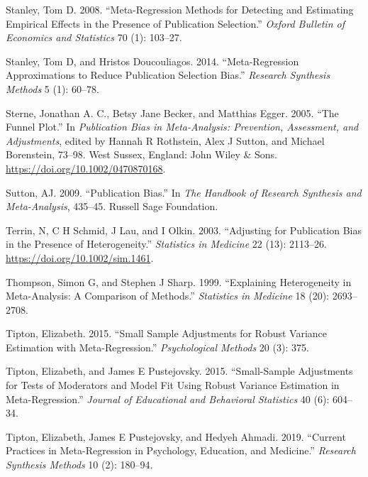 \documentclass[
]{article}
\newlength{\cslhangindent}
\newenvironment{CSLReferences}[2] %
 {\begin{list}{}{%
  \setlength{\itemindent}{0pt}
  \setlength{\leftmargin}{0pt}
  \setlength{\parsep}{0pt}
  \ifodd #1
   \setlength{\leftmargin}{\cslhangindent}
   \setlength{\itemindent}{-1\cslhangindent}
  \fi
  \setlength{\itemsep}{#2\baselineskip}}}
 {\end{list}}
\begin{document}
\begin{CSLReferences}{1}{0}
Stanley, Tom D. 2008. {``Meta-Regression Methods for Detecting and
Estimating Empirical Effects in the Presence of Publication
Selection.''} \emph{Oxford Bulletin of Economics and Statistics} 70 (1):
103--27.

Stanley, Tom D, and Hristos Doucouliagos. 2014. {``Meta-Regression
Approximations to Reduce Publication Selection Bias.''} \emph{Research
Synthesis Methods} 5 (1): 60--78.

Sterne, Jonathan A. C., Betsy Jane Becker, and Matthias Egger. 2005.
{``The Funnel Plot.''} In \emph{Publication {Bias} in {Meta-Analysis}:
{Prevention}, {Assessment}, and {Adjustments}}, edited by Hannah R
Rothstein, Alex J Sutton, and Michael Borenstein, 73--98. {West Sussex,
England}: {John Wiley \& Sons}.
\url{https://doi.org/10.1002/0470870168}.

Sutton, AJ. 2009. {``Publication Bias.''} In \emph{The Handbook of
Research Synthesis and Meta-Analysis}, 435--45. Russell Sage Foundation.

Terrin, N, C H Schmid, J Lau, and I Olkin. 2003. {``Adjusting for
Publication Bias in the Presence of Heterogeneity.''} \emph{Statistics
in Medicine} 22 (13): 2113--26. \url{https://doi.org/10.1002/sim.1461}.

Thompson, Simon G, and Stephen J Sharp. 1999. {``Explaining
Heterogeneity in Meta-Analysis: A Comparison of Methods.''}
\emph{Statistics in Medicine} 18 (20): 2693--2708.

Tipton, Elizabeth. 2015. {``Small Sample Adjustments for Robust Variance
Estimation with Meta-Regression.''} \emph{Psychological Methods} 20 (3):
375.

Tipton, Elizabeth, and James E Pustejovsky. 2015. {``Small-Sample
Adjustments for Tests of Moderators and Model Fit Using Robust Variance
Estimation in Meta-Regression.''} \emph{Journal of Educational and
Behavioral Statistics} 40 (6): 604--34.

Tipton, Elizabeth, James E Pustejovsky, and Hedyeh Ahmadi. 2019.
{``Current Practices in Meta-Regression in Psychology, Education, and
Medicine.''} \emph{Research Synthesis Methods} 10 (2): 180--94.


\end{CSLReferences}
\end{document}
